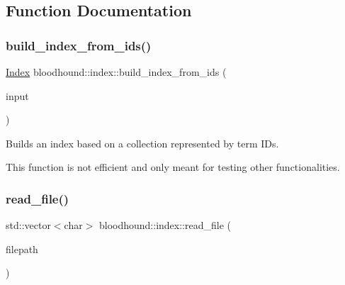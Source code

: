 \subsection{Function Documentation}
\mbox{\label{namespacebloodhound_1_1index_a95536aba16676e4fd8aefda07f19eaee}} 
\subsubsection{\texorpdfstring{build\+\_\+index\+\_\+from\+\_\+ids()}{build\_index\_from\_ids()}}
{\footnotesize\ttfamily \hyperlink{classbloodhound_1_1index_1_1Index}{Index} bloodhound\+::index\+::build\+\_\+index\+\_\+from\+\_\+ids (\begin{DoxyParamCaption}\item[{const std\+::vector$<$ std\+::vector$<$ \hyperlink{structbloodhound_1_1TermWeight}{Term\+Weight} $>$$>$ \&}]{input }\end{DoxyParamCaption})}

Builds an index based on a collection represented by term I\+Ds.

This function is not efficient and only meant for testing other functionalities. \mbox{\label{namespacebloodhound_1_1index_a4b6f89a17c10bf2927aff24df7081bb3}} 
\subsubsection{\texorpdfstring{read\+\_\+file()}{read\_file()}}
{\footnotesize\ttfamily std\+::vector$<$char$>$ bloodhound\+::index\+::read\+\_\+file (\begin{DoxyParamCaption}\item[{fs\+::path}]{filepath }\end{DoxyParamCaption})}

\mbox{\label{namespacebloodhound_1_1index_ad5486002d12948163bcdeb717c9c611c}} 
